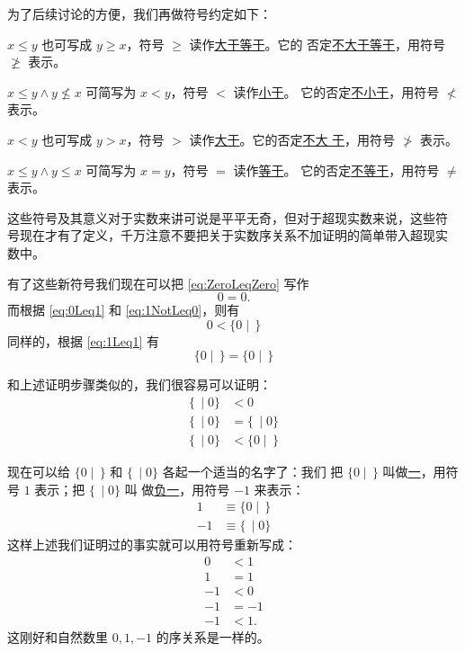 \documentclass[cs4size,a4paper,adobefonts]{ctexart}
\newcommand{\pname}[1]{\underline{#1}}
\numberwithin{equation}{section}
\begin{document}
为了后续讨论的方便，我们再做符号约定如下：
\begin{symbolDef}
  $x\leq y$ 也可写成 $y\geq x$，符号 $\geq$ 读作\pname{大于等于}。它的
  否定\pname{不大于等于}，用符号 $\ngeq$ 表示。

  $x\leq y\wedge y\nleq x$ 可简写为 $x<y$，符号 $<$ 读作\pname{小于}。
  它的否定\pname{不小于}，用符号 $\nless$ 表示。

  $x<y$ 也可写成 $y>x$，符号 $>$ 读作\pname{大于}。它的否定\pname{不大
    于}，用符号 $\ngtr$ 表示。

  $x\leq y \wedge y \leq x$ 可简写为 $x=y$，符号 $=$ 读作\pname{等于}。
  它的否定\pname{不等于}，用符号 $\neq$ 表示。
\end{symbolDef}

这些符号及其意义对于实数来讲可说是平平无奇，但对于超现实数来说，这些符
号现在才有了定义，千万注意不要把关于实数序关系不加证明的简单带入超现实
数中。

有了这些新符号我们现在可以把 \eqref{eq:ZeroLeqZero} 写作
\begin{equation*}
  0=0.
\end{equation*}
而根据 \eqref{eq:0Leq1} 和 \eqref{eq:1NotLeq0}，则有
\begin{equation*}
  0 < \{0\mid\,\}
\end{equation*}
同样的，根据 \eqref{eq:1Leq1} 有
\begin{equation*}
  \{0\mid\,\}=\{0\mid\,\}
\end{equation*}

和上述证明步骤类似的，我们很容易可以证明：
\begin{align*}
  \{\,\mid 0\} &< 0\\
  \{\,\mid 0\} &= \{\,\mid 0\}\\
  \{\,\mid 0\} &< \{0\mid \,\}
\end{align*}

现在可以给 $\{0\mid \,\}$ 和 $\{\,\mid 0\}$ 各起一个适当的名字了：我们
把 $\{0\mid \,\}$ 叫做\pname{一}，用符号 $1$ 表示；把 $\{\,\mid 0\}$ 叫
做\pname{负一}，用符号 $-1$ 来表示：
\begin{align*}
  1 &\equiv \{0\mid \,\}\\
  -1 &\equiv \{\,\mid 0\}
\end{align*}
这样上述我们证明过的事实就可以用符号重新写成：
\begin{align*}
  0 & < 1\\
  1 & = 1\\
  -1 & < 0\\
  -1 & = -1\\
  -1 & < 1.
\end{align*}
这刚好和自然数里 $0,1,-1$ 的序关系是一样的。
\end{document}
